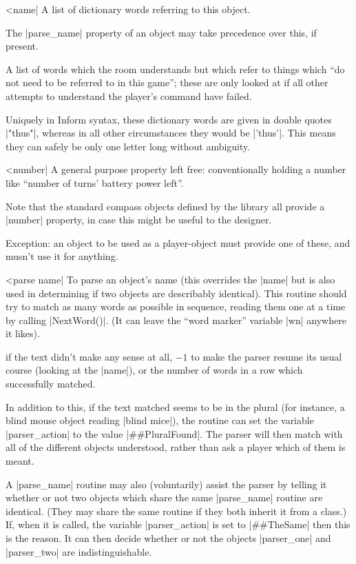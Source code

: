 {{{^^|name|
\fo A list of dictionary words referring to this object.

\warn The |parse_name| property of an object may take precedence over this,
if present.

\fr A list of words which the room understands but which refer to things
which ``do not need to be referred to in this game''; these are only looked
at if all other attempts to understand the player's command have failed.

\warn Uniquely in Inform syntax, these dictionary words are given in double
quotes |"thus"|, whereas in all other circumstances they would be |'thus'|. 
This means they can safely be only one letter long without ambiguity.

^^|number|
A general purpose property left free: conventionally holding a number like
``number of turns' battery power left''.

\fco Note that the standard compass objects defined by the library all
provide a |number| property, in case this might be useful to the designer.

\fpo Exception: an object to be used as a player-object must provide one of
these, and musn't use it for anything.

^^|parse name|
\fo To parse an object's name (this overrides the |name| but is also used in
determining if two objects are describably identical). This routine should
try to match as many words as possible in sequence, reading them one at a
time by calling |NextWord()|. (It can leave the ``word marker'' variable
|wn| anywhere it likes).

 if the text didn't make any sense at all, $-1$ to make the parser resume
its usual course (looking at the |name|), or the number of words in a row
which successfully matched.

\noindent In addition to this, if the text matched seems to be in the plural
(for instance, a blind mouse object reading |blind mice|), the routine can
set the variable |parser_action| to the value |##PluralFound|.  The parser
will then match with all of the different objects understood, rather than
ask a player which of them is meant.

\noindent A |parse_name| routine may also (voluntarily) assist the parser
by telling it whether or not two objects which share the same |parse_name|
routine are identical.  (They may share the same routine if they both inherit
it from a class.)  If, when it is called, the variable |parser_action| is
set to |##TheSame| then this is the reason.  It can then decide whether or
not the objects |parser_one| and |parser_two| are indistinguishable.

}}}
